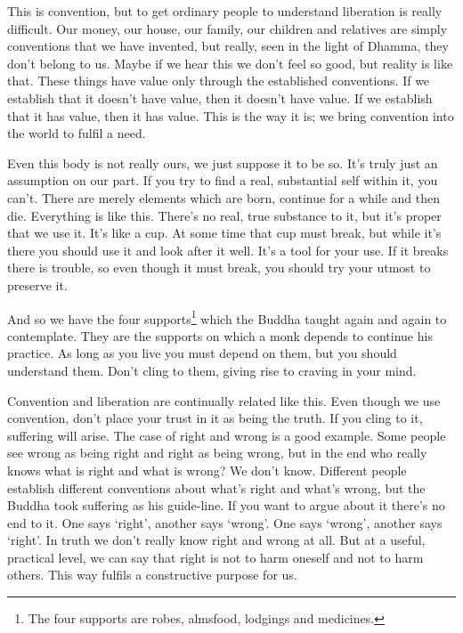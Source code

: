 This is convention, but to get ordinary people to understand liberation is really difficult. Our money, our house, our family, our children and relatives are simply conventions that we have invented, but really, seen in the light of Dhamma, they don't belong to us. Maybe if we hear this we don't feel so good, but reality is like that. These things have value only through the established conventions. If we establish that it doesn't have value, then it doesn't have value. If we establish that it has value, then it has value. This is the way it is; we bring convention into the world to fulfil a need. 

Even this body is not really ours, we just suppose it to be so. It's truly just an assumption on our part. If you try to find a real, substantial self within it, you can't. There are merely elements which are born, continue for a while and then die. Everything is like this. There's no real, true substance to it, but it's proper that we use it. It's like a cup. At some time that cup must break, but while it's there you should use it and look after it well. It's a tool for your use. If it breaks there is trouble, so even though it must break, you should try your utmost to preserve it. 

And so we have the four supports\footnote{The four supports are robes, almsfood, lodgings and medicines.} which the Buddha taught again and again to contemplate. They are the supports on which a monk depends to continue his practice. As long as you live you must depend on them, but you should understand them. Don't cling to them, giving rise to craving in your mind. 

Convention and liberation are continually related like this. Even though we use convention, don't place your trust in it as being the truth. If you cling to it, suffering will arise. The case of right and wrong is a good example. Some people see wrong as being right and right as being wrong, but in the end who really knows what is right and what is wrong? We don't know. Different people establish different conventions about what's right and what's wrong, but the Buddha took suffering as his guide-line. If you want to argue about it there's no end to it. One says `right', another says `wrong'. One says `wrong', another says `right'. In truth we don't really know right and wrong at all. But at a useful, practical level, we can say that right is not to harm oneself and not to harm others. This way fulfils a constructive purpose for us. 

